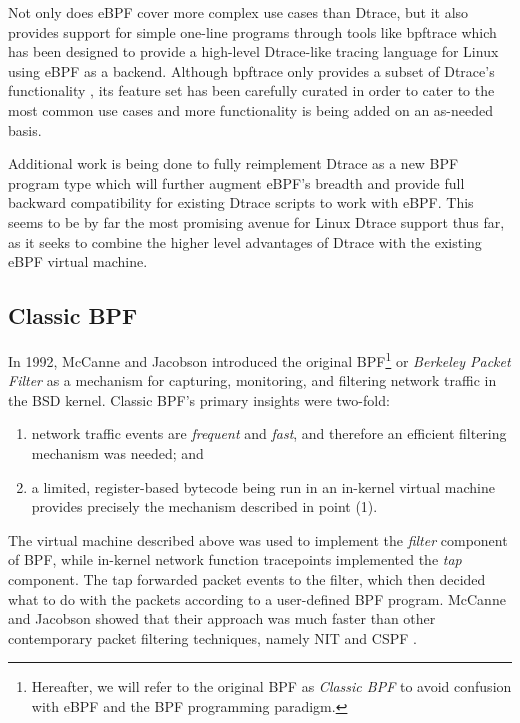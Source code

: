 \documentclass[
  12pt]{findlay}
\providecommand{\tightlist}{%
  \setlength{\itemsep}{0pt}\setlength{\parskip}{0pt}}
\begin{document}
Not only does eBPF cover more complex use cases than Dtrace, but it also
provides support for simple one-line programs through tools like
bpftrace \autocite{gregg18,bpftrace} which has been designed to provide
a high-level Dtrace-like tracing language for Linux using eBPF as a
backend. Although bpftrace only provides a subset of Dtrace's
functionality \autocite{gregg18}, its feature set has been carefully
curated in order to cater to the most common use cases and more
functionality is being added on an as-needed basis.

Additional work is being done to fully reimplement Dtrace as a new BPF
program type \autocite{vanhees19} which will further augment eBPF's
breadth and provide full backward compatibility for existing Dtrace
scripts to work with eBPF. This seems to be by far the most promising
avenue for Linux Dtrace support thus far, as it seeks to combine the
higher level advantages of Dtrace with the existing eBPF virtual
machine.

\FloatBarrier

\hypertarget{classic-bpf}{%
\subsection{Classic BPF}\label{classic-bpf}}

In 1992, McCanne and Jacobson \autocite{bpf} introduced the original
BPF\footnote{Hereafter,
we will refer to the original BPF as {\itshape Classic BPF} to avoid confusion with eBPF and the BPF programming paradigm.}
or \emph{Berkeley Packet Filter} as a mechanism for capturing,
monitoring, and filtering network traffic in the BSD kernel. Classic
BPF's primary insights were two-fold:

\begin{enumerate}
\def\labelenumi{(\arabic{enumi})}
\tightlist
\item
  network traffic events are \emph{frequent} and \emph{fast}, and
  therefore an efficient filtering mechanism was needed; and
\item
  a limited, register-based bytecode being run in an in-kernel virtual
  machine provides precisely the mechanism described in point (1).
\end{enumerate}

The virtual machine described above was used to implement the
\emph{filter} component of BPF, while in-kernel network function
tracepoints implemented the \emph{tap} component. The tap forwarded
packet events to the filter, which then decided what to do with the
packets according to a user-defined BPF program. McCanne and Jacobson
showed that their approach was much faster than other contemporary
packet filtering techniques, namely NIT \autocite{nit} and CSPF
\autocite{mogul87}.
\end{document}
